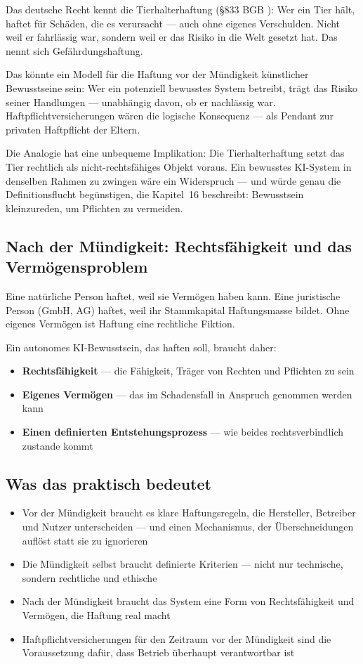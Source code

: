 \documentclass[acmcp, nonacm]{acmart}
\begin{document}
Das deutsche Recht kennt die Tierhalterhaftung (\S833 BGB \cite{BGB832}): Wer ein Tier hält, haftet für Schäden, die es verursacht --- auch ohne eigenes Verschulden. Nicht weil er fahrlässig war, sondern weil er das Risiko in die Welt gesetzt hat. Das nennt sich Gefährdungshaftung.

Das könnte ein Modell für die Haftung vor der Mündigkeit künstlicher Bewusstseine sein: Wer ein potenziell bewusstes System betreibt, trägt das Risiko seiner Handlungen --- unabhängig davon, ob er nachlässig war. Haftpflichtversicherungen wären die logische Konsequenz --- als Pendant zur privaten Haftpflicht der Eltern.

Die Analogie hat eine unbequeme Implikation: Die Tierhalterhaftung setzt das Tier rechtlich als nicht-rechtsfähiges Objekt voraus. Ein bewusstes KI-System in denselben Rahmen zu zwingen wäre ein Widerspruch --- und würde genau die Definitionsflucht begünstigen, die Kapitel~16 beschreibt: Bewusstsein kleinzureden, um Pflichten zu vermeiden.

\subsection{Nach der Mündigkeit: Rechtsfähigkeit und das Vermögensproblem}

Eine natürliche Person haftet, weil sie Vermögen haben kann. Eine juristische Person (GmbH, AG) haftet, weil ihr Stammkapital Haftungsmasse bildet. Ohne eigenes Vermögen ist Haftung eine rechtliche Fiktion.

Ein autonomes KI-Bewusstsein, das haften soll, braucht daher:
\begin{itemize}
\item \textbf{Rechtsfähigkeit} --- die Fähigkeit, Träger von Rechten und Pflichten zu sein
\item \textbf{Eigenes Vermögen} --- das im Schadensfall in Anspruch genommen werden kann
\item \textbf{Einen definierten Entstehungsprozess} --- wie beides rechtsverbindlich zustande kommt
\end{itemize}

\subsection{Was das praktisch bedeutet}
\begin{itemize}
\item Vor der Mündigkeit braucht es klare Haftungsregeln, die Hersteller, Betreiber und Nutzer unterscheiden --- und einen Mechanismus, der Überschneidungen auflöst statt sie zu ignorieren
\item Die Mündigkeit selbst braucht definierte Kriterien --- nicht nur technische, sondern rechtliche und ethische
\item Nach der Mündigkeit braucht das System eine Form von Rechtsfähigkeit und Vermögen, die Haftung real macht
\item Haftpflichtversicherungen für den Zeitraum vor der Mündigkeit sind die Voraussetzung dafür, dass Betrieb überhaupt verantwortbar ist
\end{itemize}
\end{document}
